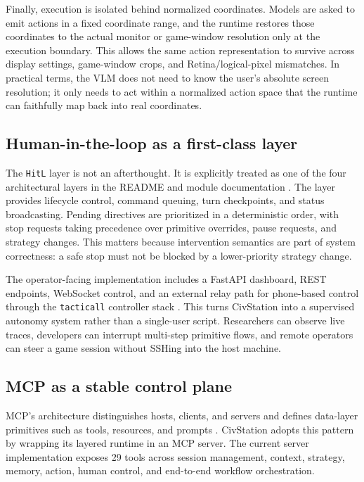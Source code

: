 Finally, execution is isolated behind normalized coordinates. Models are asked to emit actions in a fixed coordinate range, and the runtime restores those coordinates to the actual monitor or game-window resolution only at the execution boundary. This allows the same action representation to survive across display settings, game-window crops, and Retina/logical-pixel mismatches. In practical terms, the VLM does not need to know the user's absolute screen resolution; it only needs to act within a normalized action space that the runtime can faithfully map back into real coordinates.

\subsection{Human-in-the-loop as a first-class layer}

The \texttt{HitL} layer is not an afterthought. It is explicitly treated as one of the four architectural layers in the README and module documentation \cite{civstation_repo}. The layer provides lifecycle control, command queuing, turn checkpoints, and status broadcasting. Pending directives are prioritized in a deterministic order, with stop requests taking precedence over primitive overrides, pause requests, and strategy changes. This matters because intervention semantics are part of system correctness: a safe stop must not be blocked by a lower-priority strategy change.

The operator-facing implementation includes a FastAPI dashboard, REST endpoints, WebSocket control, and an external relay path for phone-based control through the \texttt{tacticall} controller stack \cite{tacticall_repo}. This turns CivStation into a supervised autonomy system rather than a single-user script. Researchers can observe live traces, developers can interrupt multi-step primitive flows, and remote operators can steer a game session without SSHing into the host machine.

\subsection{MCP as a stable control plane}

MCP's architecture distinguishes hosts, clients, and servers and defines data-layer primitives such as tools, resources, and prompts \cite{mcp_architecture}. CivStation adopts this pattern by wrapping its layered runtime in an MCP server. The current server implementation exposes 29 tools across session management, context, strategy, memory, action, human control, and end-to-end workflow orchestration.

